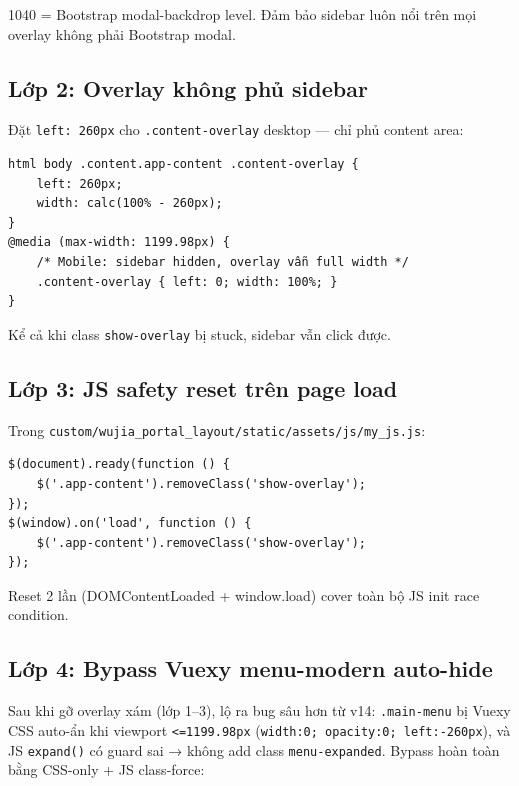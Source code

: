 1040 = Bootstrap modal-backdrop level. Đảm bảo sidebar luôn nổi trên mọi overlay không phải Bootstrap modal.

\subsection{Lớp 2: Overlay không phủ sidebar}

Đặt \texttt{left: 260px} cho \texttt{.content-overlay} desktop --- chỉ phủ content area:

\begin{lstlisting}[style=python]
html body .content.app-content .content-overlay {
    left: 260px;
    width: calc(100% - 260px);
}
@media (max-width: 1199.98px) {
    /* Mobile: sidebar hidden, overlay vẫn full width */
    .content-overlay { left: 0; width: 100%; }
}
\end{lstlisting}

Kể cả khi class \texttt{show-overlay} bị stuck, sidebar vẫn click được.

\subsection{Lớp 3: JS safety reset trên page load}

Trong \texttt{custom/wujia\_portal\_layout/static/assets/js/my\_js.js}:

\begin{lstlisting}[style=python]
$(document).ready(function () {
    $('.app-content').removeClass('show-overlay');
});
$(window).on('load', function () {
    $('.app-content').removeClass('show-overlay');
});
\end{lstlisting}

Reset 2 lần (DOMContentLoaded + window.load) cover toàn bộ JS init race condition.

\subsection{Lớp 4: Bypass Vuexy menu-modern auto-hide}

Sau khi gỡ overlay xám (lớp 1--3), lộ ra bug sâu hơn từ v14: \texttt{.main-menu} bị Vuexy CSS auto-ẩn khi viewport \texttt{<=1199.98px} (\texttt{width:0; opacity:0; left:-260px}), và JS \texttt{expand()} có guard sai → không add class \texttt{menu-expanded}. Bypass hoàn toàn bằng CSS-only + JS class-force:

